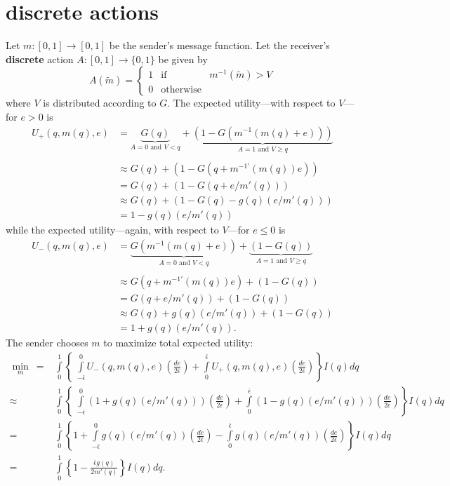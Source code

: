\documentclass[12pt]{article}
\begin{document}
\section{discrete actions}
Let $m:[0,1]\rightarrow[0,1]$ be the sender's message function. Let the receiver's \textbf{discrete} action $A:[0,1]\rightarrow\{0,1\}$ be given by
\begin{equation*}
A(\tilde{m})=\left\{\begin{array}{ccc}
1 &\text{if}& m^{-1}(\tilde{m})>V\\
0 &\text{otherwise}&
\end{array}\right.
\end{equation*}
where $V$ is distributed according to $G$. The expected utility---with respect to $V$---for $e>0$ is
\begin{align*}
U_{+}(q,m(q),e)&=\underbrace{G(q)}_{A=0\text{ and }V<q}+\underbrace{(1-G(m^{-1}(m(q)+e)))}_{A=1\text{ and }V\geq q}\\ \\
&\approx G(q)+(1-G(q+m^{-1'}(m(q))e))\\
&=G(q)+(1-G(q+e/m'(q)))\\
&\approx G(q)+(1-G(q)-g(q)(e/m'(q)))\\
&=1-g(q)(e/m'(q))
\end{align*}
while the expected utility---again, with respect to $V$---for $e\leq0$ is 
\begin{align*}
U_{-}(q,m(q),e)&=\underbrace{G(m^{-1}(m(q)+e))}_{A=0\text{ and }V<q}+\underbrace{(1-G(q))}_{A=1\text{ and }V\geq q}\\ \\
&\approx G(q+m^{-1'}(m(q))e)+(1-G(q))\\
&=G(q+e/m'(q))+(1-G(q))\\
&\approx G(q)+g(q)(e/m'(q))+(1-G(q))\\
&=1+g(q)(e/m'(q)).
\end{align*}
The sender chooses $m$ to maximize total expected utility:
\begin{align*}
\min_{m}\:=&\int\limits_{0}^{1}{\left\{\:\int\limits_{-\bar{\epsilon}}^{0}{U_{-}(q,m(q),e)\left(\frac{de}{2\bar{\epsilon}}\right)}+\int\limits_{0}^{\bar{\epsilon}}{U_{+}(q,m(q),e)\left(\frac{de}{2\bar{\epsilon}}\right)}\right\}I(q)dq}\\
\approx&\int\limits_{0}^{1}{\left\{\:\int\limits_{-\bar{\epsilon}}^{0}{(1+g(q)(e/m'(q)))\left(\frac{de}{2\bar{\epsilon}}\right)}+\int\limits_{0}^{\bar{\epsilon}}{(1-g(q)(e/m'(q)))\left(\frac{de}{2\bar{\epsilon}}\right)}\right\}I(q)dq}\\
=&\int\limits_{0}^{1}{\left\{1+\int\limits_{-\bar{\epsilon}}^{0}{g(q)(e/m'(q))\left(\frac{de}{2\bar{\epsilon}}\right)}-\int\limits_{0}^{\bar{\epsilon}}{g(q)(e/m'(q))\left(\frac{de}{2\bar{\epsilon}}\right)}\right\}I(q)dq}\\
=&\int\limits_{0}^{1}{\left\{1-\frac{\bar{\epsilon}g(q)}{2m'(q)}\right\}I(q)dq}.
\end{align*}
\end{document}
